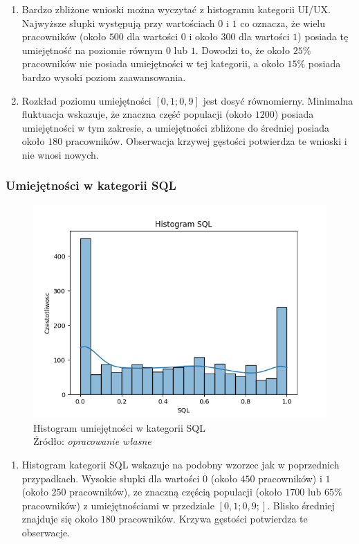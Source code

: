         \begin{enumerate}
            \item Bardzo zbliżone wnioski można wyczytać z histogramu kategorii UI/UX. Najwyższe słupki występują przy wartościach $0$ i $1$ co oznacza, że wielu pracowników (około $500$ dla wartości $0$ i około $300$ dla wartości $1$) posiada tę umiejętność na poziomie równym $0$ lub $1$. Dowodzi to, że około $25\%$ pracowników nie posiada umiejętności w tej kategorii, a około $15\%$ posiada bardzo wysoki poziom zaawansowania.
            \item Rozkład poziomu umiejętności $[0,1; 0,9]$ jest dosyć równomierny. Minimalna fluktuacja wskazuje, że znaczna część populacji (około $1200$) posiada umiejętności w tym zakresie, a umiejętności zbliżone do średniej posiada około $180$ pracowników. Obserwacja krzywej gęstości potwierdza te wnioski i nie wnosi nowych.
        \end{enumerate}
        
        \subsubsection{Umiejętności w kategorii SQL}
        \begin{figure}[H]
            \centering
            \includegraphics[width=\linewidth]{chapters/Images/hist_sql.png}
            \cprotect\caption{Histogram umiejętności w kategorii SQL\\ Źródło:\textit{ opracowanie własne}}
            \label{fig:hist_sql}
        \end{figure}

        \begin{enumerate}
            \item Histogram kategorii SQL wskazuje na podobny wzorzec jak w poprzednich przypadkach. Wysokie słupki dla wartości $0$ (około $450$ pracowników) i $1$ (około $250$ pracowników), ze znaczną częścią populacji (około $1700$ lub $65\%$ pracowników) z umiejętnościami w przedziale $[0,1; 0,9;]$. Blisko średniej znajduje się około $180$ pracowników. Krzywa gęstości potwierdza te obserwacje.
        \end{enumerate}
        
